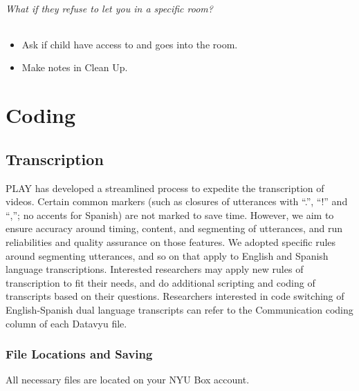 \documentclass[
]{book}
\providecommand{\tightlist}{%
  \setlength{\itemsep}{0pt}\setlength{\parskip}{0pt}}
\begin{document}
\hypertarget{what-if-they-refuse-to-let-you-in-a-specific-room}{%
\paragraph*{What if they refuse to let you in a specific room?}\label{what-if-they-refuse-to-let-you-in-a-specific-room}}

\begin{itemize}
\tightlist
\item
  Ask if child have access to and goes into the room.
\item
  Make notes in Clean Up.
\end{itemize}

\hypertarget{part-coding}{%
\part{Coding}\label{part-coding}}

\hypertarget{transcription}{%
\chapter{Transcription}\label{transcription}}

PLAY has developed a streamlined process to expedite the transcription of videos. Certain common markers (such as closures of utterances with ``.'', ``!'' and ``,''; no accents for Spanish) are not marked to save time. However, we aim to ensure accuracy around timing, content, and segmenting of utterances, and run reliabilities and quality assurance on those features. We adopted specific rules around segmenting utterances, and so on that apply to English and Spanish language transcriptions. Interested researchers may apply new rules of transcription to fit their needs, and do additional scripting and coding of transcripts based on their questions. Researchers interested in code switching of English-Spanish dual language transcripts can refer to the Communication coding column of each Datavyu file.

\hypertarget{file-locations-and-saving}{%
\section{File Locations and Saving}\label{file-locations-and-saving}}

All necessary files are located on your NYU Box account.
\end{document}
